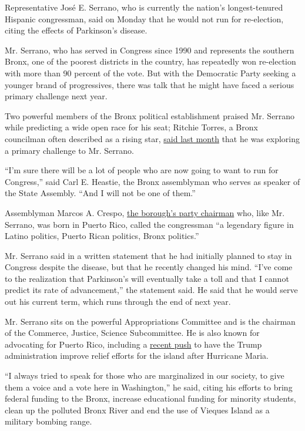 Representative José E. Serrano, who is currently the nation's
longest-tenured Hispanic congressman, said on Monday that he would not
run for re-election, citing the effects of Parkinson's disease.

Mr. Serrano, who has served in Congress since 1990 and represents the
southern Bronx, one of the poorest districts in the country, has
repeatedly won re-election with more than 90 percent of the vote. But
with the Democratic Party seeking a younger brand of progressives, there
was talk that he might have faced a serious primary challenge next year.

Two powerful members of the Bronx political establishment praised Mr.
Serrano while predicting a wide open race for his seat; Ritchie Torres,
a Bronx councilman often described as a rising star,
\href{https://www.nytimes.com/2019/02/14/nyregion/ny-congress-primaries-2020.html}{said
last month} that he was exploring a primary challenge to Mr. Serrano.

``I'm sure there will be a lot of people who are now going to want to
run for Congress,'' said Carl E. Heastie, the Bronx assemblyman who
serves as speaker of the State Assembly. ``And I will not be one of
them.''

Assemblyman Marcos A. Crespo,
\href{http://bronxdems.org/executive-board/}{the borough's party
chairman} who, like Mr. Serrano, was born in Puerto Rico, called the
congressman ``a legendary figure in Latino politics, Puerto Rican
politics, Bronx politics.''

Mr. Serrano said in a written statement that he had initially planned to
stay in Congress despite the disease, but that he recently changed his
mind. ``I've come to the realization that Parkinson's will eventually
take a toll and that I cannot predict its rate of advancement,'' the
statement said. He said that he would serve out his current term, which
runs through the end of next year.

Mr. Serrano sits on the powerful Appropriations Committee and is the
chairman of the Commerce, Justice, Science Subcommittee. He is also
known for advocating for Puerto Rico, including a
\href{https://www.nytimes.com/2017/10/09/nyregion/politicians-with-puerto-rican-roots-challenge-trump-in-push-for-aid.html}{recent
push} to have the Trump administration improve relief efforts for the
island after Hurricane Maria.

``I always tried to speak for those who are marginalized in our society,
to give them a voice and a vote here in Washington,'' he said, citing
his efforts to bring federal funding to the Bronx, increase educational
funding for minority students, clean up the polluted Bronx River and end
the use of Vieques Island as a military bombing range.

